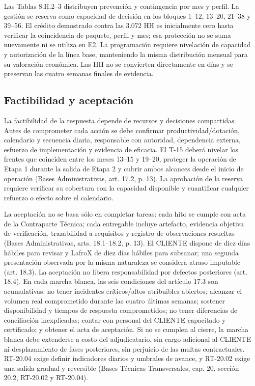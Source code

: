 Las Tablas 8.H.2--3 distribuyen prevención y contingencia por mes y perfil. La gestión se reserva como capacidad de decisión en los bloques 1--12, 13--20, 21--38 y 39--56. El crédito demostrado contra las 3.072 HH es inicialmente cero hasta verificar la coincidencia de paquete, perfil y mes; esa protección no se suma nuevamente ni se utiliza en E2. La programación requiere nivelación de capacidad y autorización de la línea base, manteniendo la misma distribución mensual para su valoración económica. Las HH no se convierten directamente en días y se preservan las cuatro semanas finales de evidencia.

\subsection{Factibilidad y aceptación}

La factibilidad de la respuesta depende de recursos y decisiones compartidas. Antes de comprometer cada acción se debe confirmar productividad/dotación, calendario y secuencia diaria, responsable con autoridad, dependencia externa, esfuerzo de implementación y evidencia de eficacia. El T-15 deberá nivelar los frentes que coinciden entre los meses 13--15 y 19--20, proteger la operación de Etapa 1 durante la salida de Etapa 2 y cubrir ambos alcances desde el inicio de operación (Bases Administrativas, art. 17.2, p. 13). La aprobación de la reserva requiere verificar su cobertura con la capacidad disponible y cuantificar cualquier refuerzo o efecto sobre el calendario.

La aceptación no se basa sólo en completar tareas: cada hito se cumple con acta de la Contraparte Técnica; cada entregable incluye artefacto, evidencia objetiva de verificación, trazabilidad a requisitos y registro de observaciones resueltas (Bases Administrativas, arts. 18.1--18.2, p. 13). El CLIENTE dispone de diez días hábiles para revisar y LafroX de diez días hábiles para subsanar; una segunda presentación observada por la misma naturaleza se considera atraso imputable (art. 18.3). La aceptación no libera responsabilidad por defectos posteriores (art. 18.4). En cada marcha blanca, las seis condiciones del artículo 17.3 son acumulativas: no tener incidentes críticos/altos atribuibles abiertos; alcanzar el volumen real comprometido durante las cuatro últimas semanas; sostener disponibilidad y tiempos de respuesta comprometidos; no tener diferencias de conciliación inexplicadas; contar con personal del CLIENTE capacitado y certificado; y obtener el acta de aceptación. Si no se cumplen al cierre, la marcha blanca debe extenderse a costo del adjudicatario, sin cargo adicional al CLIENTE ni desplazamiento de fases posteriores, sin perjuicio de las multas contractuales. RT-20.04 exige definir indicadores diarios y umbrales de avance, y RT-20.02 exige una salida gradual y reversible (Bases Técnicas Transversales, cap. 20, sección 20.2, RT-20.02 y RT-20.04).

